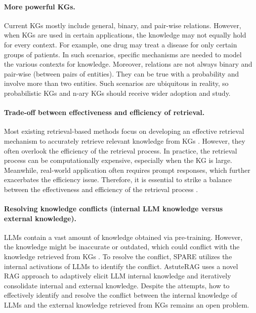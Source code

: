 \paragraph{More powerful KGs.}
Current KGs mostly include general, binary, and pair-wise relations. However, when KGs are used in certain applications, the knowledge may not equally hold for every context. For example, one drug may treat a disease for only certain groups of patients. In such scenarios, specific mechanisms are needed to model the various contexts for knowledge. Moreover, relations are not always binary and pair-wise (between pairs of entities). They can be true with a probability and involve more than two entities. Such scenarios are ubiquitous in reality, so probabilistic KGs and n-ary KGs should receive wider adoption and study.


\paragraph{Trade-off between effectiveness and efficiency of retrieval.}
Most existing retrieval-based methods focus on developing an effective retrieval mechanism to accurately retrieve relevant knowledge from KGs \cite{li2023graph,yang2024kg}. However, they often overlook the efficiency of the retrieval process. In practice, the retrieval process can be computationally expensive, especially when the KG is large. Meanwhile, real-world application often requires prompt responses, which further exacerbates the efficiency issue. Therefore, it is essential to strike a balance between the effectiveness and efficiency of the retrieval process \cite{dehghan-etal-2024-ewek}.

\paragraph{Resolving knowledge conflicts (internal LLM knowledge versus external knowledge).}
LLMs contain a vast amount of knowledge obtained via pre-training. However, the knowledge might be inaccurate or outdated, which could conflict with the knowledge retrieved from KGs \cite{xu2024knowledge}. To resolve the conflict, SPARE \cite{zhao2024steering} utilizes the internal activations of LLMs to identify the conflict. AstuteRAG \cite{wang2024astute} uses a novel RAG approach to adaptively elicit LLM internal knowledge and iteratively consolidate internal and external knowledge. Despite the attempts, how to effectively identify and resolve the conflict between the internal knowledge of LLMs and the external knowledge retrieved from KGs remains an open problem.

